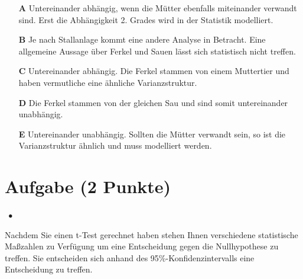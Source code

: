 \documentclass[a4paper, 9pt]{scrartcl}\usepackage[]{graphicx}\usepackage[]{xcolor}
\begin{document}
\begin{enumerate}
\item [\textbf{A} \msquare] Untereinander abhängig, wenn die Mütter ebenfalls miteinander verwandt sind. Erst die Abhängigkeit 2. Grades wird in der Statistik modelliert.
\item [\textbf{B} \msquare] Je nach Stallanlage kommt eine andere Analyse in Betracht. Eine allgemeine Aussage über Ferkel und Sauen lässt sich statistisch nicht treffen.
\item [\textbf{C} \msquare] Untereinander abhängig. Die Ferkel stammen von einem Muttertier und haben vermutliche eine ähnliche Varianzstruktur.
\item [\textbf{D} \msquare] Die Ferkel stammen von der gleichen Sau und sind somit untereinander unabhängig.
\item [\textbf{E} \msquare] Untereinander unabhängig. Sollten die Mütter verwandt sein, so ist die Varianzstruktur ähnlich und muss modelliert werden.
\end{enumerate}

\section{Aufgabe \hfill (2 Punkte)}

\ifcollection
\begin{flushright}
\tiny\vspace{-2Ex}
\textbf{\examinhaltstart}
\exammodulestatversuch $\;\bullet$
\exammodulebiostat
\vspace{-1Ex}
\end{flushright}
\fi






Nachdem Sie einen t-Test gerechnet haben stehen Ihnen verschiedene statistische Maßzahlen zu Verfügung um eine Entscheidung gegen die Nullhypothese zu treffen. Sie entscheiden sich anhand des 95\%-Konfidenzintervalls eine Entscheidung zu treffen.
\end{document}
